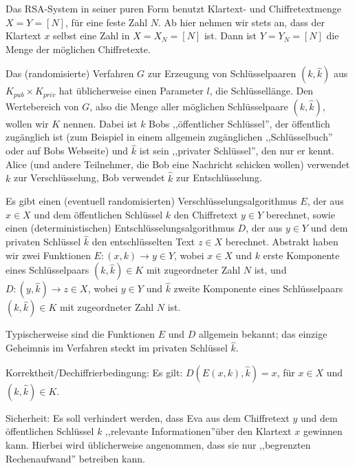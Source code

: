\documentclass[a4paper]{article}
\begin{document}
\begin{multicols}{3}
        Das RSA-System in seiner puren Form benutzt Klartext- und Chiffretextmenge $X=Y=[N]$, für eine feste Zahl $N$. Ab hier nehmen wir stets an, dass der Klartext $x$ selbst eine Zahl in $X = X_N= [N]$ ist. Dann ist $Y = Y_N= [N]$ die Menge der möglichen Chiffretexte.

        Das (randomisierte) Verfahren $G$ zur Erzeugung von Schlüsselpaaren $(k,\hat{k})$ aus $K_{pub} \times K_{priv}$ hat üblicherweise einen Parameter $l$, die Schlüssellänge. Den Wertebereich von $G$, also die Menge aller möglichen Schlüsselpaare $(k,\hat{k})$, wollen wir $K$ nennen. Dabei ist $k$ Bobs ,,öffentlicher Schlüssel'', der öffentlich zugänglich ist (zum Beispiel in einem allgemein zugänglichen ,,Schlüsselbuch'' oder auf Bobs Webseite) und $\hat{k}$ ist sein ,,privater Schlüssel'', den nur er kennt. Alice (und andere Teilnehmer, die Bob eine Nachricht schicken wollen) verwendet $k$ zur Verschlüsselung, Bob verwendet $\hat{k}$ zur Entschlüsselung.

        Es gibt einen (eventuell randomisierten) Verschlüsselungsalgorithmus $E$, der aus $x\in X$ und dem öffentlichen Schlüssel $k$ den Chiffretext $y\in Y$ berechnet, sowie einen (deterministischen) Entschlüsselungsalgorithmus $D$, der aus $y\in Y$ und dem privaten Schlüssel $\hat{k}$ den entschlüsselten Text $z\in X$ berechnet. Abstrakt haben wir zwei Funktionen $E: (x,k)\rightarrow y\in Y$, wobei $x\in X$ und $k$ erste Komponente eines Schlüsselpaars $(k,\hat{k})\in K$ mit zugeordneter Zahl $N$ ist, und $D:(y,\hat{k})\rightarrow z\in X$, wobei $y\in Y$ und $\hat{k}$ zweite Komponente eines Schlüsselpaars $(k,\hat{k})\in K$ mit zugeordneter Zahl $N$ ist.

        Typischerweise sind die Funktionen $E$ und $D$ allgemein bekannt; das einzige Geheimnis im Verfahren steckt im privaten Schlüssel $\hat{k}$.

        Korrektheit/Dechiffrierbedingung: Es gilt: $D(E(x,k), \hat{k}) =x$, für $x\in X$ und $(k,\hat{k})\in K$.

        Sicherheit: Es soll verhindert werden, dass Eva aus dem Chiffretext $y$ und dem öffentlichen Schlüssel $k$ ,,relevante Informationen''über den Klartext $x$ gewinnen kann. Hierbei wird üblicherweise angenommen, dass sie nur ,,begrenzten Rechenaufwand'' betreiben kann.


\end{multicols}
\end{document}
